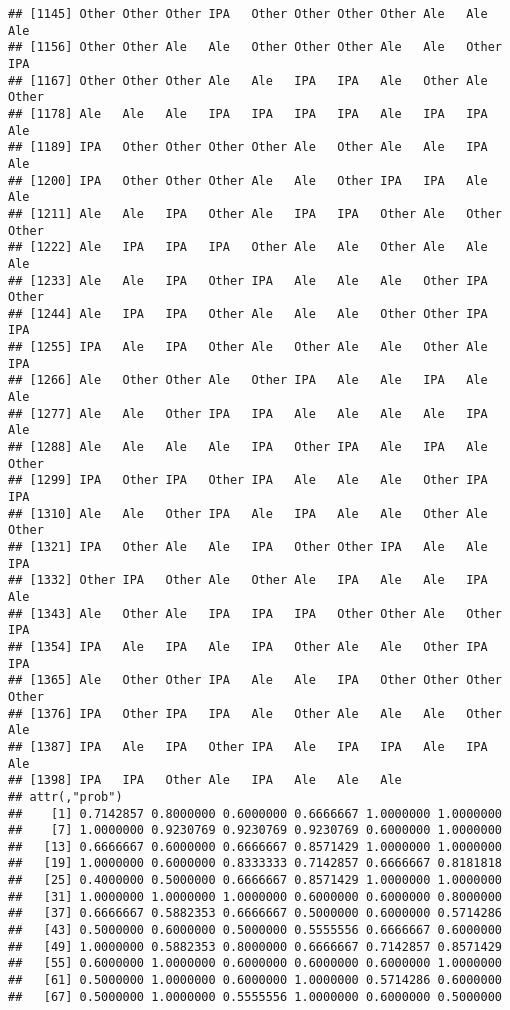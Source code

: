 \documentclass[]{article}
\begin{document}
\begin{verbatim}
## [1145] Other Other Other IPA   Other Other Other Other Ale   Ale   Ale  
## [1156] Other Other Ale   Ale   Other Other Other Ale   Ale   Other IPA  
## [1167] Other Other Other Ale   Ale   IPA   IPA   Ale   Other Ale   Other
## [1178] Ale   Ale   Ale   IPA   IPA   IPA   IPA   Ale   IPA   IPA   Ale  
## [1189] IPA   Other Other Other Other Ale   Other Ale   Ale   IPA   Ale  
## [1200] IPA   Other Other Other Ale   Ale   Other IPA   IPA   Ale   Ale  
## [1211] Ale   Ale   IPA   Other Ale   IPA   IPA   Other Ale   Other Other
## [1222] Ale   IPA   IPA   IPA   Other Ale   Ale   Other Ale   Ale   Ale  
## [1233] Ale   Ale   IPA   Other IPA   Ale   Ale   Ale   Other IPA   Other
## [1244] Ale   IPA   IPA   Other Ale   Ale   Ale   Other Other IPA   IPA  
## [1255] IPA   Ale   IPA   Other Ale   Other Ale   Ale   Other Ale   IPA  
## [1266] Ale   Other Other Ale   Other IPA   Ale   Ale   IPA   Ale   Ale  
## [1277] Ale   Ale   Other IPA   IPA   Ale   Ale   Ale   Ale   IPA   Ale  
## [1288] Ale   Ale   Ale   Ale   IPA   Other IPA   Ale   IPA   Ale   Other
## [1299] IPA   Other IPA   Other IPA   Ale   Ale   Ale   Other IPA   IPA  
## [1310] Ale   Ale   Other IPA   Ale   IPA   Ale   Ale   Other Ale   Other
## [1321] IPA   Other Ale   Ale   IPA   Other Other IPA   Ale   Ale   IPA  
## [1332] Other IPA   Other Ale   Other Ale   IPA   Ale   Ale   IPA   Ale  
## [1343] Ale   Other Ale   IPA   IPA   IPA   Other Other Ale   Other IPA  
## [1354] IPA   Ale   IPA   Ale   IPA   Other Ale   Ale   Other IPA   IPA  
## [1365] Ale   Other Other IPA   Ale   Ale   IPA   Other Other Other Other
## [1376] IPA   Other IPA   IPA   Ale   Other Ale   Ale   Ale   Other Ale  
## [1387] IPA   Ale   IPA   Other IPA   Ale   IPA   IPA   Ale   IPA   Ale  
## [1398] IPA   IPA   Other Ale   IPA   Ale   Ale   Ale  
## attr(,"prob")
##    [1] 0.7142857 0.8000000 0.6000000 0.6666667 1.0000000 1.0000000
##    [7] 1.0000000 0.9230769 0.9230769 0.9230769 0.6000000 1.0000000
##   [13] 0.6666667 0.6000000 0.6666667 0.8571429 1.0000000 1.0000000
##   [19] 1.0000000 0.6000000 0.8333333 0.7142857 0.6666667 0.8181818
##   [25] 0.4000000 0.5000000 0.6666667 0.8571429 1.0000000 1.0000000
##   [31] 1.0000000 1.0000000 1.0000000 0.6000000 0.6000000 0.8000000
##   [37] 0.6666667 0.5882353 0.6666667 0.5000000 0.6000000 0.5714286
##   [43] 0.5000000 0.6000000 0.5000000 0.5555556 0.6666667 0.6000000
##   [49] 1.0000000 0.5882353 0.8000000 0.6666667 0.7142857 0.8571429
##   [55] 0.6000000 1.0000000 0.6000000 0.6000000 0.6000000 1.0000000
##   [61] 0.5000000 1.0000000 0.6000000 1.0000000 0.5714286 0.6000000
##   [67] 0.5000000 1.0000000 0.5555556 1.0000000 0.6000000 0.5000000

\end{verbatim}
\end{document}
